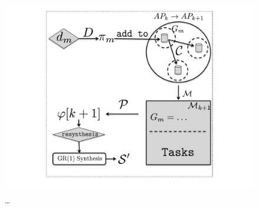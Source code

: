 \begin{figure}[h]
	\centering
	\includegraphics[width=0.9\columnwidth, clip]{./img/approach.pdf}
	\caption{\ldots} %
	\label{Fig:approach}
\end{figure}
